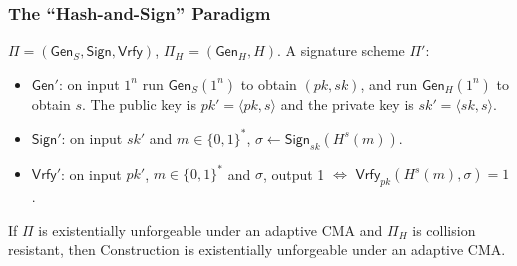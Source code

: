 \begin{frame}\frametitle{The ``Hash-and-Sign'' Paradigm}
\begin{construction}
$\Pi = (\mathsf{Gen}_S, \mathsf{Sign}, \mathsf{Vrfy})$, $\Pi_H = (\mathsf{Gen}_H, H)$. A signature scheme $\Pi'$:
\begin{itemize}
\item $\mathsf{Gen}'$: on input $1^n$ run $\mathsf{Gen}_S(1^n)$ to obtain $(pk,sk)$, and run $\mathsf{Gen}_H(1^n)$ to obtain $s$. The public key is $pk'=\langle pk,s\rangle$ and the private key is $sk' = \langle sk,s\rangle$.
\item $\mathsf{Sign}'$: on input $sk'$ and $m \in \{0,1\}^*$, $\sigma \gets \mathsf{Sign}_{sk}(H^s(m))$.
\item $\mathsf{Vrfy}'$: on input $pk'$, $m \in \{0,1\}^*$ and $\sigma$, output 1 $\iff$ $\mathsf{Vrfy}_{pk}(H^s(m),\sigma)=1$.
\end{itemize}
\end{construction}
\begin{theorem}
If $\Pi$ is existentially unforgeable under an adaptive CMA and $\Pi_H$ is collision resistant, then Construction is existentially unforgeable under an adaptive CMA.
\end{theorem}
\end{frame}
